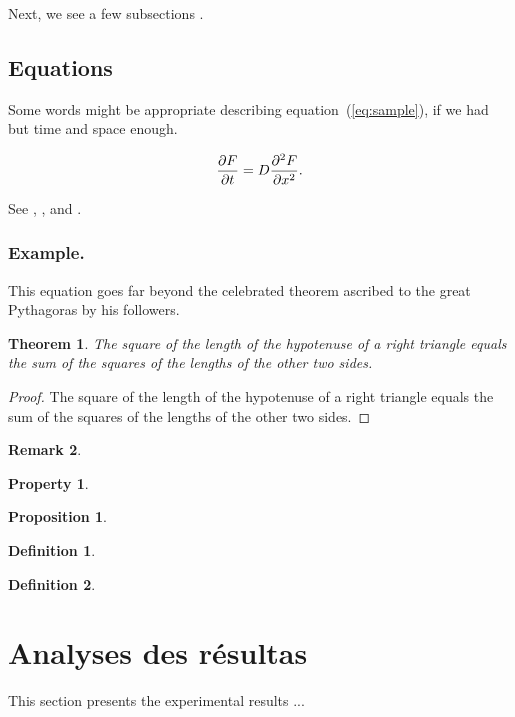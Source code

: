\documentclass[review]{elsarticle}
\newtheorem{theorem}{Theorem}
\newtheorem{remark}[theorem]{Remark}
\newtheorem{definition}{Definition}[section]
\newtheorem{property}{Property}[section]
\newtheorem{proposition}{Proposition}[section]
\begin{document}
Next, we see a few subsections \cite{chen2020artificial}.
\subsection{Equations}

Some words might be appropriate describing equation~(\ref{eq:sample}), if 
we had but time and space enough. 

\begin{equation} \label{eq:sample}
{{\partial F}\over {\partial t}} = D{{\partial^2 F}\over {\partial x^2}}.
\end{equation}

See \cite{Abl:56}, \cite{Abl:45}, \cite{Keo:58} and \cite{Pow:85}.

\subsubsection{Example.} This equation goes far beyond the
celebrated theorem ascribed to the great Pythagoras by his followers.

\begin{theorem}%
    The square of the length of the hypotenuse of a right triangle equals
the sum of the squares of the lengths of the other two sides.
\end{theorem}   

\begin{proof}%
    The square of the length of the hypotenuse of a right triangle equals the sum of the squares 
of the lengths of the other two sides.
\end{proof}    

\begin{remark}
    \lipsum[1]
\end{remark}

\begin{property}
    \lipsum[1]
\end{property}

\begin{proposition}
    \lipsum[1]
\end{proposition}

\begin{definition}
    \lipsum[1]
\end{definition}
\begin{definition}
    \lipsum[1]
\end{definition}

\section{Analyses des résultas}\label{sec:experiments}
This section presents the experimental results ...
\end{document}

